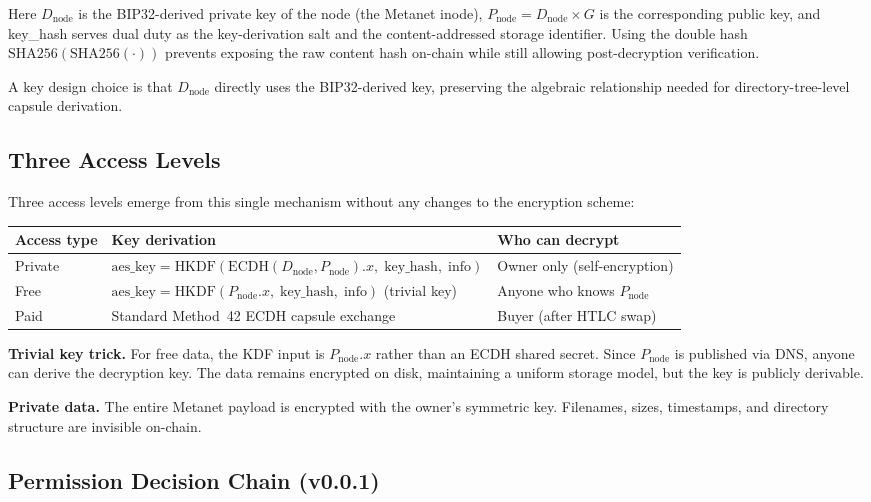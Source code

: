 \documentclass[11pt,a4paper]{article}
\begin{document}
Here $D_{\text{node}}$ is the BIP32-derived private key of the node (the Metanet inode), $P_{\text{node}} = D_{\text{node}} \times G$ is the corresponding public key, and key\_hash serves dual duty as the key-derivation salt and the content-addressed storage identifier. Using the double hash $\text{SHA256}(\text{SHA256}(\cdot))$ prevents exposing the raw content hash on-chain while still allowing post-decryption verification.

A key design choice is that $D_{\text{node}}$ directly uses the BIP32-derived key, preserving the algebraic relationship needed for directory-tree-level capsule derivation.

\subsection{Three Access Levels}

Three access levels emerge from this single mechanism without any changes to the encryption scheme:

\begin{table}[h]
\centering
\begin{tabular}{@{}lp{6cm}l@{}}
\toprule
\textbf{Access type} & \textbf{Key derivation} & \textbf{Who can decrypt} \\
\midrule
Private & $\text{aes\_key} = \text{HKDF}(\text{ECDH}(D_{\text{node}}, P_{\text{node}}).x,\; \text{key\_hash},\; \text{info})$ & Owner only (self-encryption) \\
Free & $\text{aes\_key} = \text{HKDF}(P_{\text{node}}.x,\; \text{key\_hash},\; \text{info})$ (trivial key) & Anyone who knows $P_{\text{node}}$ \\
Paid & Standard Method~42 ECDH capsule exchange & Buyer (after HTLC swap) \\
\bottomrule
\end{tabular}
\end{table}

\textbf{Trivial key trick.} For free data, the KDF input is $P_{\text{node}}.x$ rather than an ECDH shared secret. Since $P_{\text{node}}$ is published via DNS, anyone can derive the decryption key. The data remains encrypted on disk, maintaining a uniform storage model, but the key is publicly derivable.

\textbf{Private data.} The entire Metanet payload is encrypted with the owner's symmetric key. Filenames, sizes, timestamps, and directory structure are invisible on-chain.

\subsection{Permission Decision Chain (v0.0.1)}
\label{sec:permission}
\end{document}
